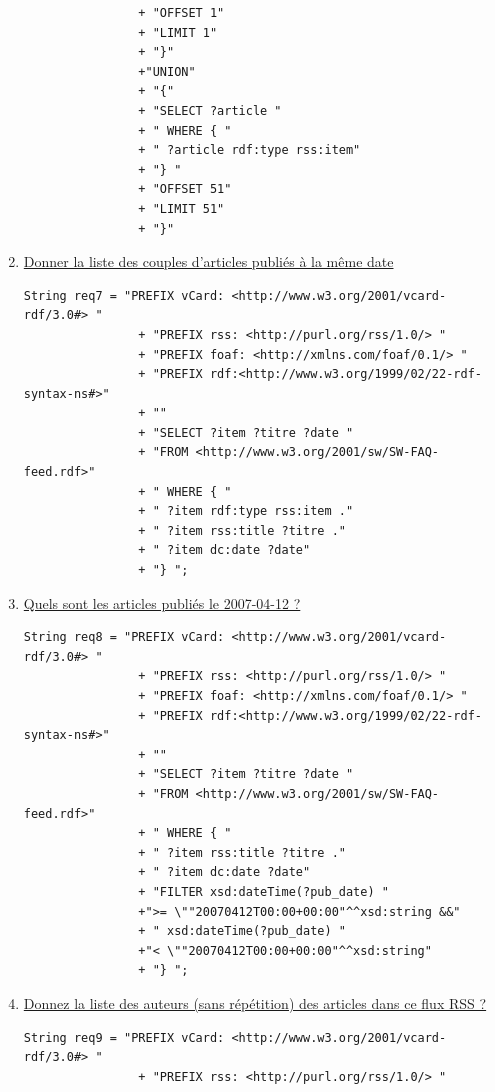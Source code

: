 \documentclass[12pt,a4paper]{article}
\begin{document}
\begin{justify}
\begin{enumerate}
\begin{verbatim}
                + "OFFSET 1"
                + "LIMIT 1"
                + "}"
                +"UNION"
                + "{"
                + "SELECT ?article "
                + " WHERE { "
                + " ?article rdf:type rss:item"
                + "} "
                + "OFFSET 51"
                + "LIMIT 51"
                + "}"
            \end{verbatim}
            \item \underline{Donner la liste des couples d’articles publiés à la même date}
            \begin{verbatim}
String req7 = "PREFIX vCard: <http://www.w3.org/2001/vcard-rdf/3.0#> "
                + "PREFIX rss: <http://purl.org/rss/1.0/> "
                + "PREFIX foaf: <http://xmlns.com/foaf/0.1/> "
                + "PREFIX rdf:<http://www.w3.org/1999/02/22-rdf-syntax-ns#>"
                + ""
                + "SELECT ?item ?titre ?date "
                + "FROM <http://www.w3.org/2001/sw/SW-FAQ-feed.rdf>"
                + " WHERE { "
                + " ?item rdf:type rss:item ."
                + " ?item rss:title ?titre ."
                + " ?item dc:date ?date"
                + "} ";
            \end{verbatim}
            \item \underline{Quels sont les articles publiés le 2007-04-12 ?}
            \begin{verbatim}
String req8 = "PREFIX vCard: <http://www.w3.org/2001/vcard-rdf/3.0#> "
                + "PREFIX rss: <http://purl.org/rss/1.0/> "
                + "PREFIX foaf: <http://xmlns.com/foaf/0.1/> "
                + "PREFIX rdf:<http://www.w3.org/1999/02/22-rdf-syntax-ns#>"
                + ""
                + "SELECT ?item ?titre ?date "
                + "FROM <http://www.w3.org/2001/sw/SW-FAQ-feed.rdf>"
                + " WHERE { "
                + " ?item rss:title ?titre ."
                + " ?item dc:date ?date"
                + "FILTER xsd:dateTime(?pub_date) "
                +">= \""20070412T00:00+00:00"^^xsd:string &&"
                + " xsd:dateTime(?pub_date) "
                +"< \""20070412T00:00+00:00"^^xsd:string"
                + "} ";
            \end{verbatim}
            \item \underline{Donnez la liste des auteurs (sans répétition) des articles dans ce flux RSS ?}
            \begin{verbatim}
String req9 = "PREFIX vCard: <http://www.w3.org/2001/vcard-rdf/3.0#> "
                + "PREFIX rss: <http://purl.org/rss/1.0/> "

\end{verbatim}
\end{enumerate}
\end{justify}
\end{document}

